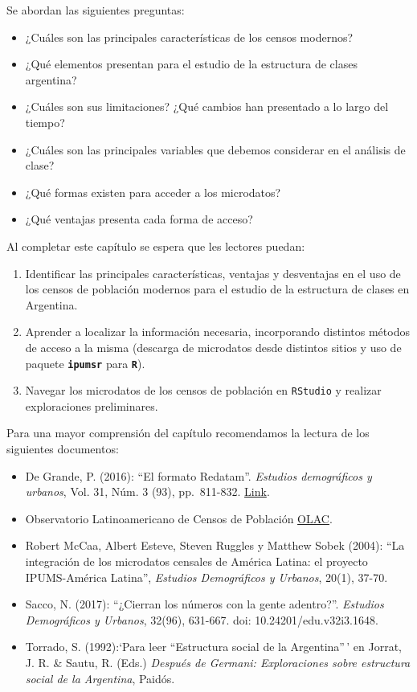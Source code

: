 \documentclass[
]{article}
\providecommand{\tightlist}{%
  \setlength{\itemsep}{0pt}\setlength{\parskip}{0pt}}
\begin{document}
Se abordan las siguientes preguntas:

\begin{itemize}
\tightlist
\item
  ¿Cuáles son las principales características de los censos modernos?
\item
  ¿Qué elementos presentan para el estudio de la estructura de clases argentina?
\item
  ¿Cuáles son sus limitaciones? ¿Qué cambios han presentado a lo largo del tiempo?
\item
  ¿Cuáles son las principales variables que debemos considerar en el análisis de clase?
\item
  ¿Qué formas existen para acceder a los microdatos?
\item
  ¿Qué ventajas presenta cada forma de acceso?
\end{itemize}

Al completar este capítulo se espera que les lectores puedan:

\begin{enumerate}
\def\labelenumi{\arabic{enumi}.}
\tightlist
\item
  Identificar las principales características, ventajas y desventajas en el uso de los censos de población modernos para el estudio de la estructura de clases en Argentina.
\item
  Aprender a localizar la información necesaria, incorporando distintos métodos de acceso a la misma (descarga de microdatos desde distintos sitios y uso de paquete \textbf{\texttt{ipumsr}} para \textbf{\texttt{R}}).
\item
  Navegar los microdatos de los censos de población en \texttt{RStudio} y realizar exploraciones preliminares.
\end{enumerate}

Para una mayor comprensión del capítulo recomendamos la lectura de los siguientes documentos:

\begin{itemize}
\item
  De Grande, P. (2016): ``El formato Redatam''. \emph{Estudios demográficos y urbanos}, Vol. 31, Núm. 3 (93), pp.~811-832. \href{https://estudiosdemograficosyurbanos.colmex.mx/index.php/edu/article/view/15/pdf}{Link}.
\item
  Observatorio Latinoamericano de Censos de Población \href{https://observatoriocensal.org/}{OLAC}.
\item
  Robert McCaa, Albert Esteve, Steven Ruggles y Matthew Sobek (2004): ``La integración de los microdatos censales de América Latina: el proyecto IPUMS-América Latina'', \emph{Estudios Demográficos y Urbanos}, 20(1), 37-70.
\item
  Sacco, N. (2017): ``¿Cierran los números con la gente adentro?''. \emph{Estudios Demográficos y Urbanos}, 32(96), 631-667. doi: 10.24201/edu.v32i3.1648.
\item
  Torrado, S. (1992):`Para leer ``Estructura social de la Argentina''\,' en Jorrat, J. R. \& Sautu, R. (Eds.) \emph{Después de Germani: Exploraciones sobre estructura social de la Argentina}, Paidós.
\end{itemize}
\end{document}
